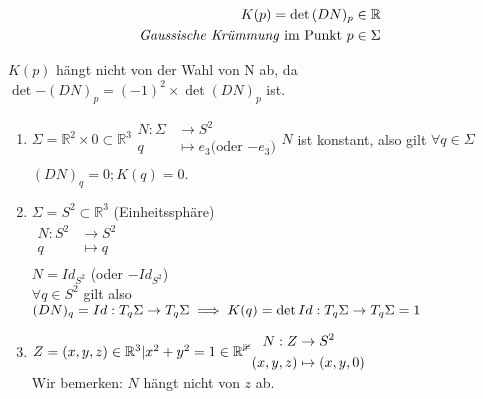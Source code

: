 \documentclass[../main.tex]{subfiles}
\begin{document}
\begin{definition}
    \begin{align*}
        K(p) = \det{(DN)_{p}}\in \mathbb{R}\\
        \text{\emph{Gaussische Krümmung} im Punkt } p \in \Sigma
    \end{align*}
\end{definition}
\begin{remark}
    $K(p)$ hängt nicht von der Wahl von N ab, da $\det{-(DN)_{p}} = (-1)^{2} \times \det{(DN)_{p}}$ ist.
\end{remark}
\begin{example}
    \begin{enumerate}
        \item $\Sigma = \mathbb{R}^{2} \times {0} \subset \mathbb{R}^{3}
        \begin{aligned}
            N : \Sigma & \to S^{2}\\
            q & \mapsto e_{3} \text{(oder $-e_{3}$)}\\
        \end{aligned}
        N$ ist konstant, also gilt $\forall q \in \Sigma$\\
        $(DN)_{q} = 0; K(q) = 0$.
        \item $\Sigma = S^{2} \subset \mathbb{R}^{3}$ (Einheitssphäre)\\
        $\begin{aligned}
            N: S^{2} &\to S^{2}\\
            q &\mapsto q\\
        \end{aligned}$\\
        $N = Id_{S^{2}}$ (oder $-Id_{S^{2}}$)\\
        $\forall q \in S^{2}$ gilt also $(DN)_{q} = Id : T_{q}\Sigma \to T_{q}\Sigma\\
        \implies K(q) = \det{Id: T_{q}\Sigma \to T_{q}\Sigma} = 1$
        \item $Z = {(x,y,z)\in \mathbb{R}^{3} | x^{2} + y^{2} = 1}\in \mathbb{R^{3}}\\
        \begin{aligned}
            N : Z &\to S^{2}\\
            (x,y,z) &\mapsto (x,y,0)\\
        \end{aligned}$\\
        Wir bemerken: $N$ hängt nicht von $z$ ab. 

\end{enumerate}
\end{example}
\end{document}
